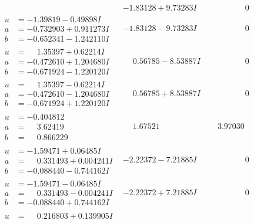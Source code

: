 \documentclass[1p]{elsarticle_modified}
\theoremstyle{definition}
\begin{document}
$$\begin{array}{c|c|c}
 & -1.83128 + 9.73283 I & \phantom{-0.000000 } 0 \\ \hline\begin{aligned}
u &= -1.39819 - 0.49898 I \\
a &= -0.732903 + 0.911273 I \\
b &= -0.652341 - 1.242110 I\end{aligned}
 & -1.83128 - 9.73283 I & \phantom{-0.000000 } 0 \\ \hline\begin{aligned}
u &= \phantom{-}1.35397 + 0.62214 I \\
a &= -0.472610 + 1.204680 I \\
b &= -0.671924 - 1.220120 I\end{aligned}
 & \phantom{-}0.56785 - 8.53887 I & \phantom{-0.000000 } 0 \\ \hline\begin{aligned}
u &= \phantom{-}1.35397 - 0.62214 I \\
a &= -0.472610 - 1.204680 I \\
b &= -0.671924 + 1.220120 I\end{aligned}
 & \phantom{-}0.56785 + 8.53887 I & \phantom{-0.000000 } 0 \\ \hline\begin{aligned}
u &= -0.404812\phantom{ +0.000000I} \\
a &= \phantom{-}3.62419\phantom{ +0.000000I} \\
b &= \phantom{-}0.866229\phantom{ +0.000000I}\end{aligned}
 & \phantom{-}1.67521\phantom{ +0.000000I} & \phantom{-}3.97030\phantom{ +0.000000I} \\ \hline\begin{aligned}
u &= -1.59471 + 0.06485 I \\
a &= \phantom{-}0.331493 + 0.004241 I \\
b &= -0.088440 - 0.744162 I\end{aligned}
 & -2.22372 - 7.21885 I & \phantom{-0.000000 } 0 \\ \hline\begin{aligned}
u &= -1.59471 - 0.06485 I \\
a &= \phantom{-}0.331493 - 0.004241 I \\
b &= -0.088440 + 0.744162 I\end{aligned}
 & -2.22372 + 7.21885 I & \phantom{-0.000000 } 0 \\ \hline\begin{aligned}
u &= \phantom{-}0.216803 + 0.139905 I \\

\end{aligned}
\end{array}$$
\end{document}
